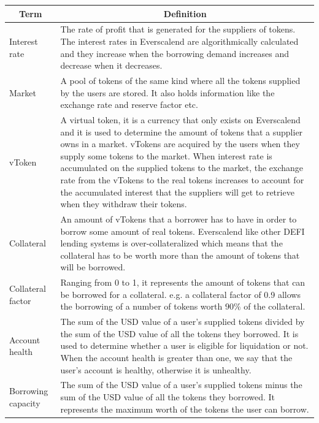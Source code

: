 \begin{tabularx}{\linewidth}{|l|X|}
  \hline
  \multicolumn{1}{|c|}{\textbf{Term}} & \multicolumn{1}{c|}{\textbf{Definition}} \\\hline
  \endhead

  Interest rate & The rate of profit that is generated for the suppliers of tokens. The interest rates in Everscalend are algorithmically calculated and they increase when the borrowing demand increases and decrease when it decreases. \\\hline

  Market & A pool of tokens of the same kind where all the tokens supplied by the users are stored. It also holds information like the exchange rate and reserve factor etc. \\\hline

  vToken & A virtual token, it is a currency that only exists on Everscalend and it is used to determine the amount of tokens that a supplier owns in a market. vTokens are acquired by the users when they supply some tokens to the market. When interest rate is accumulated on the supplied tokens to the market, the exchange rate from the vTokens to the real tokens increases to account for the accumulated interest that the suppliers will get to retrieve when they withdraw their tokens. \\\hline

  Collateral & An amount of vTokens that a borrower has to have in order to borrow some amount of real tokens. Everscalend like other DEFI lending systems is over-collateralized which means that the collateral has to be worth more than the amount of tokens that will be borrowed. \\\hline

  Collateral factor & Ranging from 0 to 1, it represents the amount of tokens that can be borrowed for a collateral. e.g. a collateral factor of 0.9 allows the borrowing of a number of tokens worth $90\%$ of the collateral. \\\hline

  Account health & The sum of the USD value of a user's supplied tokens divided by the sum of the USD value of all the tokens they borrowed. It is used to determine whether a user is eligible for liquidation or not. When the account health is greater than one, we say that the user's account is healthy, otherwise it is unhealthy. \\\hline

  Borrowing capacity & The sum of the USD value of a user's supplied tokens minus the sum of the USD value of all the tokens they borrowed. It represents the maximum worth of the tokens the user can borrow. \\\hline


\end{tabularx}
